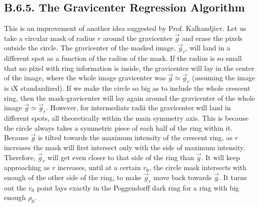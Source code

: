\documentclass[11pt, a4paper, twoside]{article} %
\begin{document}
\vspace{-0.3cm}



\subsection*{B.6.5. The Gravicenter Regression Algorithm}\vspace{-0.15cm}
This is an improvement of another idea suggested by Prof. Kalkandjiev. Let us take a circular mask of radius $r$ around the gravicenter $\vec{g}$ and erase the pixels outside the circle. The gravicenter of the masked image, $\vec{g}_r$, will land in a different spot as a function of the radius of the mask. If the radius is so small that no pixel with ring information is inside, the gravicenter will lay in the center of the image, where the whole image gravicenter was $\vec{g}\simeq\vec{g}_r$ (assuming the image is iX standardized). If we make the circle so big as to include the whole crescent ring, then the mask-gravicenter will lay again around the gravicenter of the whole image $\vec{g}\simeq\vec{g}_r$. However, for intermediate radii the gravicenter will land in different spots, all theoretically within the main symmetry axis. This is because the circle always takes a symmetric piece of each half of the ring within it. Because $\vec{g}$ is tilted towards the maximum intensity of the crescent ring, as $r$ increases the mask will first intersect only with the side of maximum intensity. Therefore, $\vec{g}_r$ will get even closer to that side of the ring than $\vec{g}$. It will keep approaching as $r$ increases, until at a certain $r_0$, the circle mask intersects with enough of the other side of the ring, to make $\vec{g}_r$ move back towards $\vec{g}$. It turns out the $r_0$ point lays exactly in the Poggendorff dark ring for a ring with big enough $\rho_0$. 
\end{document}

